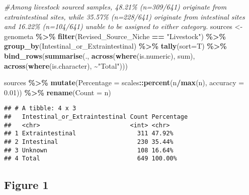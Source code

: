 \documentclass[
]{article}
\newenvironment{Shaded}{\begin{snugshade}}{\end{snugshade}}
\newcommand{\AttributeTok}[1]{\textcolor[rgb]{0.13,0.29,0.53}{#1}}
\newcommand{\CommentTok}[1]{\textcolor[rgb]{0.56,0.35,0.01}{\textit{#1}}}
\newcommand{\FloatTok}[1]{\textcolor[rgb]{0.00,0.00,0.81}{#1}}
\newcommand{\FunctionTok}[1]{\textcolor[rgb]{0.13,0.29,0.53}{\textbf{#1}}}
\newcommand{\NormalTok}[1]{#1}
\newcommand{\OtherTok}[1]{\textcolor[rgb]{0.56,0.35,0.01}{#1}}
\newcommand{\SpecialCharTok}[1]{\textcolor[rgb]{0.81,0.36,0.00}{\textbf{#1}}}
\newcommand{\StringTok}[1]{\textcolor[rgb]{0.31,0.60,0.02}{#1}}
\begin{document}
\begin{Shaded}
\begin{Highlighting}[]
\CommentTok{\#Among livestock sourced samples, 48.21\% (n=309/641) originate from extraintestinal sites, while 35.57\% (n=228/641) originate from intestinal sites and 16.22\% (n=104/641) unable to be assigned to either category.}
\NormalTok{sources }\OtherTok{\textless{}{-}}\NormalTok{ genometa }\SpecialCharTok{\%\textgreater{}\%} \FunctionTok{filter}\NormalTok{(Revised\_Source\_Niche }\SpecialCharTok{==} \StringTok{"Livestock"}\NormalTok{) }\SpecialCharTok{\%\textgreater{}\%} \FunctionTok{group\_by}\NormalTok{(Intestinal\_or\_Extraintestinal) }\SpecialCharTok{\%\textgreater{}\%} \FunctionTok{tally}\NormalTok{(}\AttributeTok{sort=}\NormalTok{T)   }\SpecialCharTok{\%\textgreater{}\%} 
  \FunctionTok{bind\_rows}\NormalTok{(}\FunctionTok{summarise}\NormalTok{(.,}
                      \FunctionTok{across}\NormalTok{(}\FunctionTok{where}\NormalTok{(is.numeric), sum),}
                      \FunctionTok{across}\NormalTok{(}\FunctionTok{where}\NormalTok{(is.character), }\SpecialCharTok{\textasciitilde{}}\StringTok{"Total"}\NormalTok{)))}

\NormalTok{sources }\SpecialCharTok{\%\textgreater{}\%} \FunctionTok{mutate}\NormalTok{(}\AttributeTok{Percentage =}\NormalTok{ scales}\SpecialCharTok{::}\FunctionTok{percent}\NormalTok{(n}\SpecialCharTok{/}\FunctionTok{max}\NormalTok{(n), }\AttributeTok{accuracy =} \FloatTok{0.01}\NormalTok{)) }\SpecialCharTok{\%\textgreater{}\%} \FunctionTok{rename}\NormalTok{(}\StringTok{\textquotesingle{}Count\textquotesingle{}} \OtherTok{=}\NormalTok{ n)}
\end{Highlighting}
\end{Shaded}

\begin{verbatim}
## # A tibble: 4 x 3
##   Intestinal_or_Extraintestinal Count Percentage
##   <chr>                         <int> <chr>     
## 1 Extraintestinal                 311 47.92%    
## 2 Intestinal                      230 35.44%    
## 3 Unknown                         108 16.64%    
## 4 Total                           649 100.00%
\end{verbatim}

\hypertarget{figure-1}{%
\subsection{Figure 1}\label{figure-1}}
\end{document}
